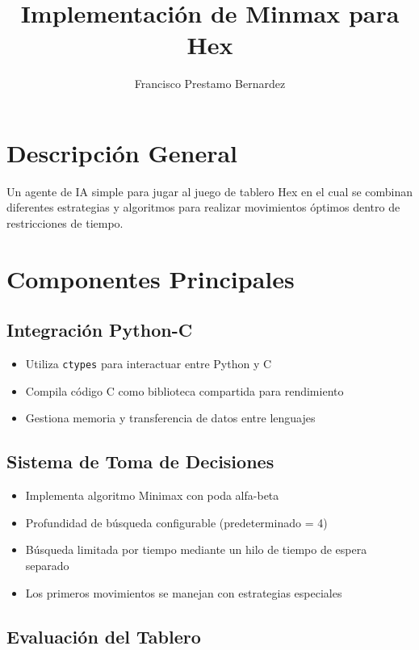 \documentclass{article}
\begin{document}
\title{Implementación de Minmax para Hex}
\author{Francisco Prestamo Bernardez}
\date{}
\maketitle

\section{Descripción General}
Un agente de IA simple para jugar al juego de tablero Hex en el cual se combinan diferentes estrategias y algoritmos para realizar movimientos óptimos dentro de restricciones de tiempo.

\section{Componentes Principales}

\subsection{Integración Python-C}
\begin{itemize}
    \item Utiliza \texttt{ctypes} para interactuar entre Python y C
    \item Compila código C como biblioteca compartida para rendimiento
    \item Gestiona memoria y transferencia de datos entre lenguajes
\end{itemize}

\subsection{Sistema de Toma de Decisiones}
\begin{itemize}
    \item Implementa algoritmo Minimax con poda alfa-beta
    \item Profundidad de búsqueda configurable (predeterminado = 4)
    \item Búsqueda limitada por tiempo mediante un hilo de tiempo de espera separado
    \item Los primeros movimientos se manejan con estrategias especiales
\end{itemize}

\subsection{Evaluación del Tablero}
\end{document}
